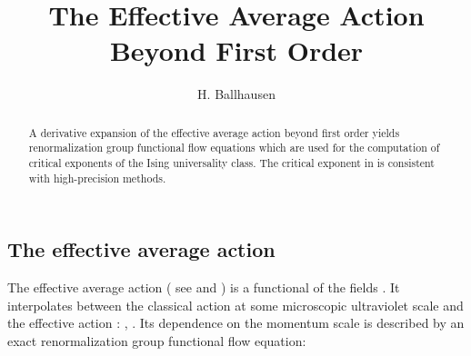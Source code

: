 \documentclass[a4paper,aps,prl,twocolumn,groupedaddress]{revtex4}
\begin{document}
\providecommand{\Ui}{U^\prime}
\providecommand{\Uii}{U^{\prime\prime}}
\providecommand{\Uiii}{U^{\prime\prime\prime}}
\providecommand{\Uiiii}{U^{\prime\prime\prime\prime}}

\providecommand{\Z}{Z_0}
\providecommand{\Zi}{{Z_0^\prime}}
\providecommand{\Zii}{Z_0^{\prime\prime}}

\providecommand{\ZZ}{Z_1}
\providecommand{\ZZi}{{Z_1^\prime}}
\providecommand{\ZZii}{Z_1^{\prime\prime}}

\providecommand{\ui}{u^\prime}
\providecommand{\uii}{u^{\prime\prime}}
\providecommand{\uiii}{u^{\prime\prime\prime}}
\providecommand{\uiiii}{u^{\prime\prime\prime\prime}}

\providecommand{\z}{z_0}
\providecommand{\zi}{{z_0^\prime}}
\providecommand{\zii}{z_0^{\prime\prime}}

\providecommand{\zz}{z_1}
\providecommand{\zzi}{{z_1^\prime}}
\providecommand{\zzii}{z_1^{\prime\prime}}





\title{The Effective Average Action Beyond First Order}
\author{H. Ballhausen}

\begin{abstract}
\noindent
A derivative expansion of the effective average action beyond first order yields renormalization
group functional flow equations which are used for the computation of critical exponents of the
Ising universality class. The critical exponent \myHighlight{$\nu$}\coordHE{} in \coordHE{} is consistent with high-precision methods.
\end{abstract}

\maketitle





\subsection*{The effective average action}

\noindent
The effective average action \coordHE{} ( see \cite{Lit1} and \cite{Lit2,Lit3,Lit4,Lit5} ) is a functional of the fields
\myHighlight{$\varphi$}\coordHE{}. It interpolates between the classical action \coordHE{} at some microscopic ultraviolet scale
\myHighlight{$\Lambda$}\coordHE{} and the effective action \myHighlight{$\Gamma$}\coordHE{}: \coordHE{}, \coordHE{}.
Its dependence on the momentum scale \coordHE{} is described by an exact renormalization group
functional flow equation:
\end{document}
